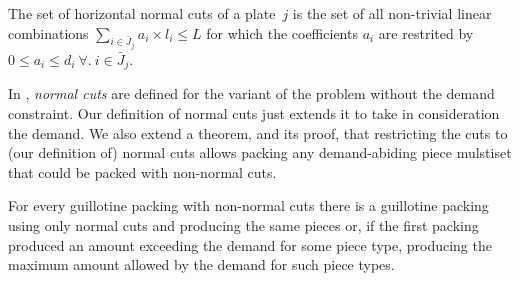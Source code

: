\documentclass[runningheads]{llncs}
\begin{document}
\begin{definition}
The set of horizontal normal cuts of a plate~\(j\) is the set of all non-trivial linear combinations \(\sum_{i \in \bar{J}_j} a_i \times l_i \leq L\) for which the coefficients \(a_i\) are restrited by \(0 \leq a_i \leq d_i~\forall.~i \in \bar{J}_j\).
\end{definition}

In \cite{nicos:1977}, \emph{normal cuts} are defined for the variant of the problem without the demand constraint.
Our definition of normal cuts just extends it to take in consideration the demand.
We also extend a theorem, and its proof, that restricting the cuts to (our definition of) normal cuts allows packing any demand-abiding piece mulstiset that could be packed with non-normal cuts.

\begin{theorem}\label{only_normal_cuts_needed}
For every guillotine packing with non-normal cuts there is a guillotine packing using only normal cuts and producing the same pieces or, if the first packing produced an amount exceeding the demand for some piece type, producing the maximum amount allowed by the demand for such piece types.
\end{theorem}
\end{document}
